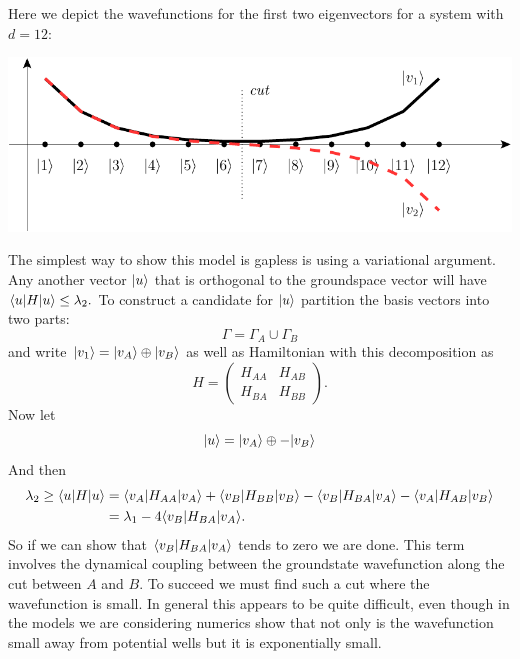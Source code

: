 \documentclass[12pt]{article}
\begin{document}
Here we depict the wavefunctions for
the first two eigenvectors for a system with $d=12:$
\begin{center}
\includegraphics[]{pic-dwell.pdf}
\end{center}
The simplest way to show this model
is gapless is using a variational
argument.
Any another vector $|{u}\rangle$
that is orthogonal to the groundspace
vector will have $\langle{u}|H|{u}\rangle \le \lambda_2.$
To construct a candidate for $|{u}\rangle$
partition the
basis vectors into two parts:
$$
    \Gamma = \Gamma_A \cup \Gamma_B
$$
and write $|{v_1}\rangle = 
|{v_A}\rangle\oplus|{v_B}\rangle$
as well as Hamiltonian with this
decomposition as
$$
H = 
\left(\begin{array}{ll}
H_{AA} & H_{AB} \\
H_{BA} & H_{BB}
\end{array}\right).
$$
Now let
$$
    |{u}\rangle = |{v_A}\rangle \oplus -|{v_B}\rangle
$$
And then
\begin{align*}
    \lambda_2 \ge \langle{u}|H|{u}\rangle &= 
\langle{v_A}|H_{AA}|{v_A}\rangle +
\langle{v_B}|H_{BB}|{v_B}\rangle -
\langle{v_B}|H_{BA}|{v_A}\rangle -
\langle{v_A}|H_{AB}|{v_B}\rangle \\
    &= \lambda_1 - 4 \langle{v_B}|H_{BA}|{v_A}\rangle.
\end{align*}
So if we can show that 
$ \langle{v_B}|H_{BA}|{v_A}\rangle$
tends to zero we are done.
This term involves the 
dynamical coupling between the
groundstate wavefunction along
the cut between $A$ and $B$.
To succeed we must find such a cut where
the wavefunction is small. In general
this appears to be quite difficult,
even though in the models we are considering
numerics show that not only is the
wavefunction small away from potential wells
but it is exponentially small.

\end{document}
